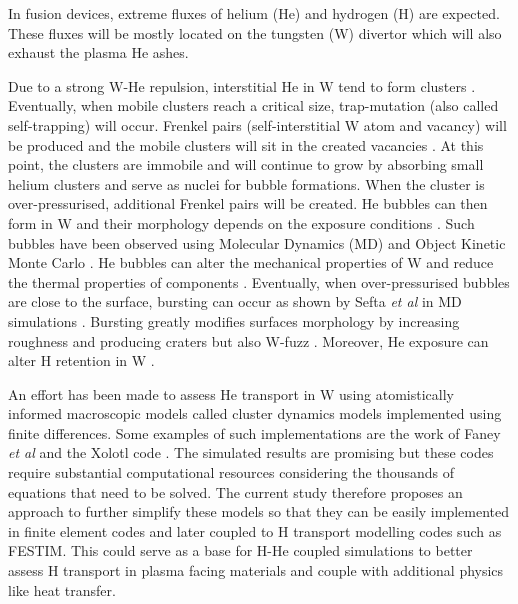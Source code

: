 In fusion devices, extreme fluxes of helium (He) and hydrogen (H) are expected.
These fluxes will be mostly located on the tungsten (W) divertor which will also exhaust the plasma He ashes.

Due to a strong W-He repulsion, interstitial He in W tend to form clusters .
Eventually, when mobile clusters reach a critical size, trap-mutation (also called self-trapping) will occur.
Frenkel pairs (self-interstitial W atom and vacancy) will be produced and the mobile clusters will sit in the created vacancies .
At this point, the clusters are immobile and will continue to grow by absorbing small helium clusters and serve as nuclei for bubble formations.
When the cluster is over-pressurised, additional Frenkel pairs will be created.
He bubbles can then form in W and their morphology depends on the exposure conditions .
Such bubbles have been observed using Molecular Dynamics (MD)   and Object Kinetic Monte Carlo .
He bubbles can alter the mechanical properties of W  and reduce the thermal properties of components .
Eventually, when over-pressurised bubbles are close to the surface, bursting can occur as shown by Sefta \textit{et al} in MD simulations .
Bursting greatly modifies surfaces morphology by increasing roughness and producing craters  but also W-fuzz .
Moreover, He exposure can alter H retention in W \cite{ialovega_hydrogen_2020, markelj_hydrogen_2017, ogorodnikova_deuterium_2011, baldwin_effect_2011, miyamoto_microscopic_2011, ueda_simultaneous_2009}.

An effort has been made to assess He transport in W using atomistically informed macroscopic models called cluster dynamics models implemented using finite differences.
Some examples of such implementations are the work of Faney \textit{et al}  and the Xolotl code .
The simulated results are promising but these codes require substantial computational resources considering the thousands of equations that need to be solved.
The current study therefore proposes an approach to further simplify these models so that they can be easily implemented in finite element codes and later coupled to H transport modelling codes such as FESTIM.
This could serve as a base for H-He coupled simulations to better assess H transport in plasma facing materials and couple with additional physics like heat transfer.


